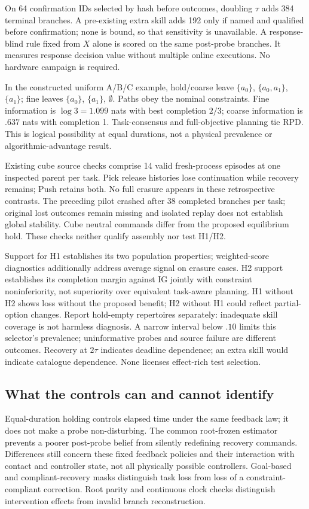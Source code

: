 On 64 confirmation IDs selected by hash before outcomes, doubling $\tau$ adds 384 terminal branches. A pre-existing extra skill adds 192 only if named and qualified before confirmation; none is bound, so that sensitivity is unavailable. A response-blind rule fixed from $X$ alone is scored on the same post-probe branches. It measures response decision value without multiple online executions. No hardware campaign is required.

In the constructed uniform A/B/C example, hold/coarse leave $\{a_0\}$, $\{a_0,a_1\}$, $\{a_1\}$; fine leaves $\{a_0\}$, $\{a_1\}$, $\emptyset$. Paths obey the nominal constraints. Fine information is $\log3=1.099$ nats with best completion $2/3$; coarse information is $.637$ nats with completion 1. Task-consensus and full-objective planning tie RPD. This is logical possibility at equal durations, not a physical prevalence or algorithmic-advantage result.

Existing cube source checks comprise 14 valid fresh-process episodes at one inspected parent per task. Pick release histories lose continuation while recovery remains; Push retains both. No full erasure appears in these retrospective contrasts. The preceding pilot crashed after 38 completed branches per task; original lost outcomes remain missing and isolated replay does not establish global stability. Cube neutral commands differ from the proposed equilibrium hold. These checks neither qualify assembly nor test H1/H2.

Support for H1 establishes its two population properties; weighted-score diagnostics additionally address average signal on erasure cases. H2 support establishes its completion margin against IG jointly with constraint noninferiority, not superiority over equivalent task-aware planning. H1 without H2 shows loss without the proposed benefit; H2 without H1 could reflect partial-option changes. Report hold-empty repertoires separately: inadequate skill coverage is not harmless diagnosis. A narrow interval below $.10$ limits this selector's prevalence; uninformative probes and source failure are different outcomes. Recovery at $2\tau$ indicates deadline dependence; an extra skill would indicate catalogue dependence. None licenses effect-rich test selection.

\subsection{What the controls can and cannot identify}
Equal-duration holding controls elapsed time under the same feedback law; it does not make a probe non-disturbing. The common root-frozen estimator prevents a poorer post-probe belief from silently redefining recovery commands. Differences still concern these fixed feedback policies and their interaction with contact and controller state, not all physically possible controllers. Goal-based and compliant-recovery masks distinguish task loss from loss of a constraint-compliant correction. Root parity and continuous clock checks distinguish intervention effects from invalid branch reconstruction.

